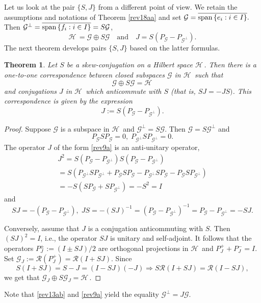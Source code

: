 \documentclass[12pt]{amsart}
\newcommand{\cR}{\mathcal{R}}
\newtheorem{thm}{Theorem}
\theoremstyle{definition}
\newcommand{\cH}{\mathcal{H}\,}
\newcommand{\cG}{\mathcal{G}}
\begin{document}
Let us look at the pair $\{S,J\}$ from a different point of view. We retain the assumptions and notations of Theorem \ref{rev18aa} and set
 $\cG=\overline{{\rm span\,}\{e_{i}:i\in I \}}.$ Then $\cG^\perp=\overline{{\rm span\,}\{f_{i} :i\in I\}}=S\cG$,
 $$\cH=\cG\oplus S\cG\quad  \textrm{and}\quad
J=S(P_\cG-P_{\cG^\perp}).$$
The next theorem develops pairs $\{S,J\}$ based on  the latter formulas.
\begin{thm}\label{07aver}
Let $S$ be a skew-conjugation on a Hilbert space $\cH$. Then there is a one-to-one correspondence between closed  subspaces $\cG$ in $\cH$ such that
\begin{equation}\label{rev13ab}
\cG\oplus S\cG=\cH
\end{equation}
and conjugations $J$ in $\cH$ which  anticommute with $S$ (that is, $SJ=-JS)$. This correspondence is  given by the expression
\begin{equation}\label{rev9a}
J:=S(P_\cG- P_{\cG^\perp}).
\end{equation}
\end{thm}
\begin{proof}
Suppose $\cG$ is a subspace in $\cH$ and $\cG^\perp=S\cG$. Then $\cG=S\cG^\perp$ and
$$P_{\cG}SP_{\cG}=0,\; P_{\cG^\perp}SP_{\cG^\perp}=0.$$
The operator $J$ of the form \eqref{rev9a} is an anti-unitary operator,
\[
\begin{array}{l}
J^2=S(P_\cG- P_{\cG^\perp})S(P_\cG-P_{\cG^\perp})\\[2mm]
=S(P_{\cG^\perp}SP_{\cG^\perp}+P_{\cG}SP_{\cG}-P_{\cG^\perp}SP_{\cG}-P_{\cG}SP_{\cG^\perp})\\[2mm]
=-S(SP_{\cG}+SP_{\cG^\perp})=-S^2=I
\end{array}
\]
and
\[
SJ=-(P_\cG-P_{\cG^\perp}),\; JS=-(SJ)^{-1}=(P_\cG-P_{\cG^\perp})^{-1}=P_\cG-P_{\cG^\perp}=-SJ.
\]

Conversely,  assume that $J$ is a conjugation anticommuting with $S.$ Then $(SJ)^2=I$, i.e., the operator $SJ$ is unitary and self-adjoint.
It follows that the operators $P^{\pm}_J:=(I\pm SJ)/2$ are orthogonal projections in $\cH$ and $P^+_J+P^-_J=I$.
Set $\cG_J:=\cR(P^{+}_J)=\cR(I+SJ).$ Since
\[
S(I+SJ)=S-J=(I-SJ)(-J)\Longrightarrow S\cR(I+SJ)=\cR(I-SJ),
\]
we get that $\cG_J\oplus S\cG_J=\cH.$
\end{proof}
Note that \eqref{rev13ab} and \eqref{rev9a} yield the equality $\cG^\perp=J\cG$.
\end{document}
